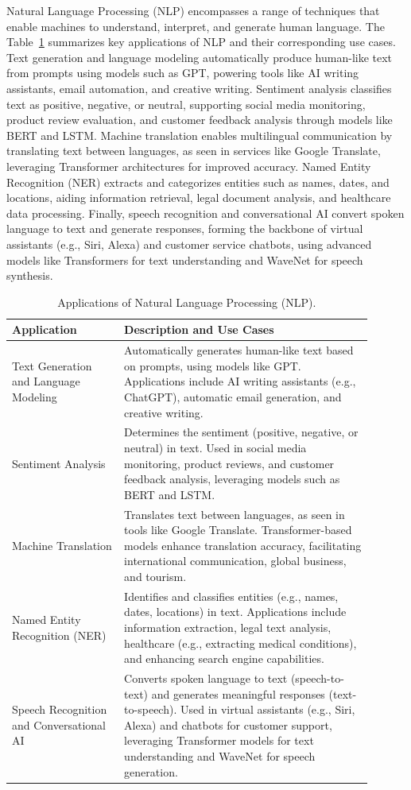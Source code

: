 Natural Language Processing (NLP) encompasses a range of techniques that
enable machines to understand, interpret, and generate human language. The
Table~\ref{tab:ch1-nlp} summarizes key applications of NLP and their corresponding use
cases. Text generation and language modeling automatically produce human-like
text from prompts using models such as GPT, powering tools like AI writing
assistants, email automation, and creative writing. Sentiment analysis classifies
text as positive, negative, or neutral, supporting social media monitoring,
product review evaluation, and customer feedback analysis through models like
BERT and LSTM. Machine translation enables multilingual communication by
translating text between languages, as seen in services like Google Translate,
leveraging Transformer architectures for improved accuracy. Named Entity
Recognition (NER) extracts and categorizes entities such as names, dates, and
locations, aiding information retrieval, legal document analysis, and healthcare
data processing. Finally, speech recognition and conversational AI convert
spoken language to text and generate responses, forming the backbone
of virtual assistants (e.g., Siri, Alexa) and customer service chatbots, using
advanced models like Transformers for text understanding and WaveNet for
speech synthesis.

\begin{table}[h]
\centering
\begin{tabular}{p{0.28\linewidth} p{0.62\linewidth}}
\toprule
\textbf{Application} & \textbf{Description and Use Cases} \\
\midrule
Text Generation and Language Modeling &
Automatically generates human-like text based on prompts,
using models like GPT. Applications include AI writing assistants
(e.g., ChatGPT), automatic email generation, and
creative writing. \\
\midrule
Sentiment Analysis &
Determines the sentiment (positive, negative, or neutral) in
text. Used in social media monitoring, product reviews, and
customer feedback analysis, leveraging models such as BERT
and LSTM. \\
\midrule
Machine Translation &
Translates text between languages, as seen in tools like
Google Translate. Transformer-based models enhance translation
accuracy, facilitating international communication,
global business, and tourism. \\
\midrule
Named Entity Recognition (NER) &
Identifies and classifies entities (e.g., names, dates, locations)
in text. Applications include information extraction,
legal text analysis, healthcare (e.g., extracting medical conditions),
and enhancing search engine capabilities. \\
\midrule
Speech Recognition and Conversational AI &
Converts spoken language to text (speech-to-text) and generates
meaningful responses (text-to-speech). Used in virtual
assistants (e.g., Siri, Alexa) and chatbots for customer support,
leveraging Transformer models for text understanding
and WaveNet for speech generation. \\
\bottomrule
\end{tabular}
\caption{Applications of Natural Language Processing (NLP).}
\label{tab:ch1-nlp}
\end{table}

